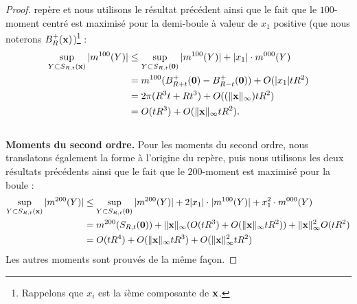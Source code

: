 \begin{proof}
repère et nous utilisons le résultat précédent ainsi que le fait que le
$100$-moment centré est maximisé pour la demi-boule à valeur de $x_1$ positive
(que nous noterons $B^+_{R}(\mathbf{x})$)\footnote{Rappelons que $x_i$ est la
$i$ème composante de $\mathbf{x}$.} :
%
\begin{align}
  \sup_{Y \subset S_{R,t}(\mathbf{x})} |m^{100}(Y)|
  &\le \sup_{Y \subset S_{R,t}(\mathbf{0})} |m^{100}(Y)| + |x_1|\cdot m^{000}(Y)\nonumber \\
  &= m^{100}( B^+_{R+t}(\mathbf{0}) - B^+_{R-t}(\mathbf{0}) ) + O(|x_1|tR^2) \nonumber \\
  &= 2\pi(R^3t +Rt^3) + O( (\| \mathbf{x} \|_\infty) tR^2) \nonumber \\
  &= O(tR^3) + O(\| \mathbf{x} \|_\infty tR^2).
\end{align}
%
\textbf{\\Moments du second ordre.\quad}
%
Pour les moments du second ordre, nous translatons également la forme à
l'origine du repère, puis nous utilisons les deux résultats précédents ainsi que
le fait que le $200$-moment est maximisé pour la boule :
%
\begin{align}
  \sup_{Y \subset S_{R,t}(\mathbf{x})} |m^{200}(Y)| &
  \le \sup_{Y \subset S_{R,t}(\mathbf{0})} |m^{200}(Y)| + 2|x_1|\cdot |m^{100}(Y)| + x_1^2\cdot m^{000}(Y) \nonumber \\
  & = m^{200}(S_{R,t}(\mathbf{0})) + \|\mathbf{x}\|_\infty (O(tR^3) + O(\|\mathbf{x}\|_\infty tR^2))+  \|\mathbf{x}\|_\infty^2 O(tR^2) \nonumber \\
  & = O(tR^4) +O(\|\mathbf{x}\|_\infty tR^3) +O(\|\mathbf{x}\|_\infty^2 tR^2)
\end{align}
%
Les autres moments sont prouvés de la même façon.
%
\end{proof}
%
